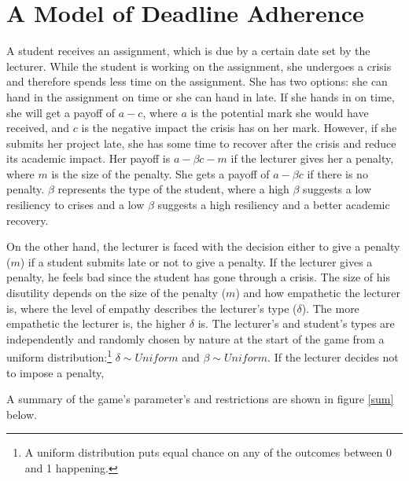 \documentclass[11pt,preprint, authoryear]{elsarticle}
\numberwithin{equation}{section}
\numberwithin{figure}{section}
\numberwithin{table}{section}
\let\rmarkdownfootnote\footnote%
\def\footnote{\protect\rmarkdownfootnote}
\begin{document}
\hypertarget{a-model-of-deadline-adherence}{%
\section{\texorpdfstring{A Model of Deadline Adherence
\label{game}}{A Model of Deadline Adherence }}\label{a-model-of-deadline-adherence}}

A student receives an assignment, which is due by a certain date set by
the lecturer. While the student is working on the assignment, she
undergoes a crisis and therefore spends less time on the assignment. She
has two options: she can hand in the assignment on time or she can hand
in late. If she hands in on time, she will get a payoff of \(a-c\),
where \(a\) is the potential mark she would have received, and \(c\) is
the negative impact the crisis has on her mark. However, if she submits
her project late, she has some time to recover after the crisis and
reduce its academic impact. Her payoff is \(a-\beta c -m\) if the
lecturer gives her a penalty, where \(m\) is the size of the penalty.
She gets a payoff of \(a-\beta c\) if there is no penalty. \(\beta\)
represents the type of the student, where a high \(\beta\) suggests a
low resiliency to crises and a low \(\beta\) suggests a high resiliency
and a better academic recovery.

On the other hand, the lecturer is faced with the decision either to
give a penalty (\(m\)) if a student submits late or not to give a
penalty. If the lecturer gives a penalty, he feels bad since the student
has gone through a crisis. The size of his disutility depends on the
size of the penalty (\(m\)) and how empathetic the lecturer is, where
the level of empathy describes the lecturer's type (\(\delta\)). The
more empathetic the lecturer is, the higher \(\delta\) is. The
lecturer's and student's types are independently and randomly chosen by
nature at the start of the game from a uniform distribution:\footnote{A
  uniform distribution puts equal chance on any of the outcomes between
  0 and 1 happening.} \(\delta \sim Uniform\) and
\(\beta \sim Uniform\). If the lecturer decides not to impose a penalty,

A summary of the game's parameter's and restrictions are shown in figure
\ref{sum} below.
\end{document}
